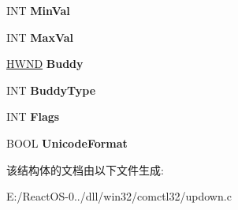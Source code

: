 \begin{DoxyCompactItemize}
\mbox{\label{struct_u_p_d_o_w_n___i_n_f_o_aaaead40386ef0000456897a72c7ef1ad}} 
I\+NT {\bfseries Min\+Val}
\item 
\mbox{\label{struct_u_p_d_o_w_n___i_n_f_o_a51fd2aecc2213eca0402a3e7d8b2c864}} 
I\+NT {\bfseries Max\+Val}
\item 
\mbox{\label{struct_u_p_d_o_w_n___i_n_f_o_a3663c8d994ca535424f77eaa18c11594}} 
\hyperlink{interfacevoid}{H\+W\+ND} {\bfseries Buddy}
\item 
\mbox{\label{struct_u_p_d_o_w_n___i_n_f_o_adaddec71af2791ecd4b9f9fb6c022405}} 
I\+NT {\bfseries Buddy\+Type}
\item 
\mbox{\label{struct_u_p_d_o_w_n___i_n_f_o_aced7e49d59858c48a3d5530c2d74e0fb}} 
I\+NT {\bfseries Flags}
\item 
\mbox{\label{struct_u_p_d_o_w_n___i_n_f_o_aabd6d154efbdb637557fea6de044222a}} 
B\+O\+OL {\bfseries Unicode\+Format}
\end{DoxyCompactItemize}


该结构体的文档由以下文件生成\+:\begin{DoxyCompactItemize}
\item 
E\+:/\+React\+O\+S-\/0../dll/win32/comctl32/updown.\+c\end{DoxyCompactItemize}
